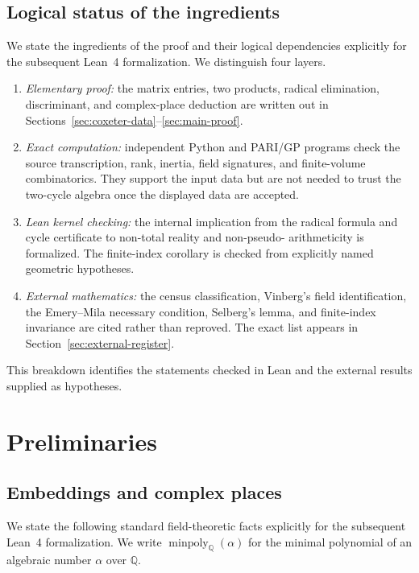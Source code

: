 \documentclass[11pt]{article}
\numberwithin{equation}{section}
\theoremstyle{definition}
\theoremstyle{remark}
\newcommand{\Q}{\mathbb{Q}}
\newcommand{\minpoly}{\operatorname{minpoly}}
\begin{document}
\subsection{Logical status of the ingredients}
\label{subsec:logical-status}

We state the ingredients of the proof and their logical dependencies
explicitly for the subsequent Lean~4 formalization.  We distinguish four
layers.

\begin{enumerate}[label=\textbf{L\arabic*.},leftmargin=3em]
\item \emph{Elementary proof:} the matrix entries, two products, radical
  elimination, discriminant, and complex-place deduction are written out in
  Sections~\ref{sec:coxeter-data}--\ref{sec:main-proof}.
\item \emph{Exact computation:} independent Python and PARI/GP programs check
  the source transcription, rank, inertia, field signatures, and finite-volume
  combinatorics.  They support the input data but are not needed to trust the
  two-cycle algebra once the displayed data are accepted.
\item \emph{Lean kernel checking:} the internal implication from the radical
  formula and cycle certificate to non-total reality and non-pseudo-
  arithmeticity is formalized.  The finite-index corollary is checked from
  explicitly named geometric hypotheses.
\item \emph{External mathematics:} the census classification, Vinberg's
  field identification, the Emery--Mila necessary condition, Selberg's lemma,
  and finite-index invariance are cited rather than reproved.  The exact list
  appears in Section~\ref{sec:external-register}.
\end{enumerate}

This breakdown identifies the statements checked in Lean and the external
results supplied as hypotheses.

\section{Preliminaries}
\label{sec:basics}

\subsection{Embeddings and complex places}

We state the following standard field-theoretic facts explicitly for the
subsequent Lean~4 formalization.  We write \(\minpoly_\Q(\alpha)\) for the
minimal polynomial of an algebraic number \(\alpha\) over \(\Q\).
\end{document}
